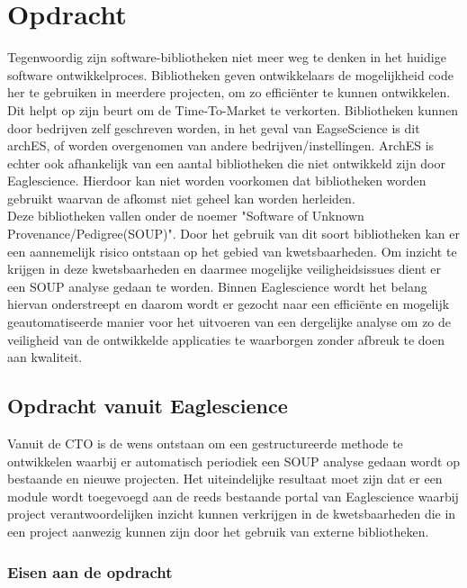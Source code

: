 
\chapter{Opdracht} %
\label{ch:opdracht} %
Tegenwoordig zijn software-bibliotheken niet meer weg te denken in het huidige software ontwikkelproces. Bibliotheken geven ontwikkelaars de mogelijkheid code her te gebruiken in meerdere projecten, om zo effici\"enter te kunnen ontwikkelen. Dit helpt op zijn beurt om de Time-To-Market te verkorten. Bibliotheken kunnen door bedrijven zelf geschreven worden, in het geval van EagseScience is dit archES, of worden overgenomen van andere bedrijven/instellingen. ArchES is echter ook afhankelijk van een aantal bibliotheken die niet ontwikkeld zijn door Eaglescience.  Hierdoor kan niet worden voorkomen dat bibliotheken worden gebruikt waarvan de afkomst niet geheel kan worden herleiden.\\
Deze bibliotheken vallen onder de noemer "Software of Unknown Provenance/Pedigree(SOUP)". Door het gebruik van dit soort bibliotheken kan er een aannemelijk risico ontstaan op het gebied van kwetsbaarheden. Om inzicht te krijgen in deze kwetsbaarheden en daarmee mogelijke veiligheidsissues dient er een SOUP analyse gedaan te worden. Binnen Eaglescience wordt het belang hiervan onderstreept en daarom wordt er gezocht naar een efficiënte en mogelijk geautomatiseerde manier voor het uitvoeren van een dergelijke analyse om zo de veiligheid van de ontwikkelde applicaties te waarborgen zonder afbreuk te doen aan kwaliteit.

\section{Opdracht vanuit Eaglescience}
Vanuit de CTO is de wens ontstaan om een gestructureerde methode te ontwikkelen waarbij er automatisch periodiek een SOUP analyse gedaan wordt op bestaande en nieuwe projecten. Het uiteindelijke resultaat moet zijn dat er een module wordt toegevoegd aan de reeds bestaande portal van Eaglescience waarbij project verantwoordelijken inzicht kunnen verkrijgen in de kwetsbaarheden die in een project aanwezig kunnen zijn door het gebruik van externe bibliotheken.

\subsection{Eisen aan de opdracht}

